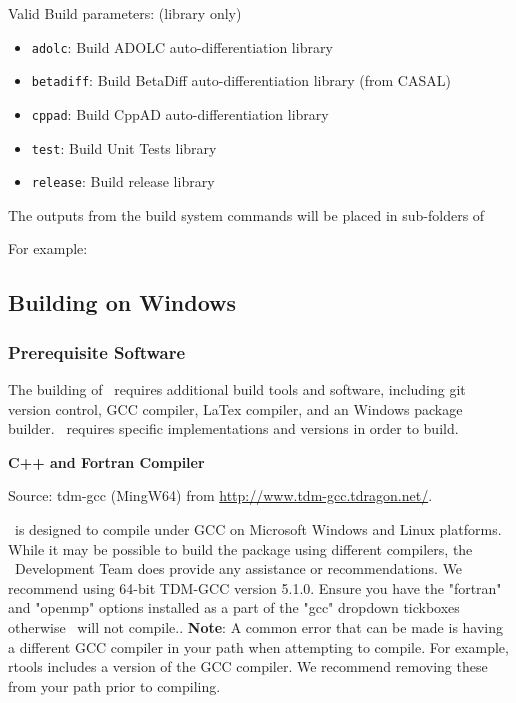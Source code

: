 Valid Build parameters: (library only)
\begin{itemize}
  \item \texttt{adolc}: Build ADOLC auto-differentiation library
  \item \texttt{betadiff}: Build BetaDiff auto-differentiation library (from CASAL)
  \item \texttt{cppad}: Build CppAD auto-differentiation library
  \item \texttt{test}: Build Unit Tests library
  \item \texttt{release}: Build release library
\end{itemize}

The outputs from the build system commands will be placed in sub-folders of 

For example:





\subsection{Building on Windows}

\subsubsection{Prerequisite Software}

The building of \CNAME\ requires additional build tools and software, including git version control, GCC compiler, LaTex compiler, and an Windows package builder. \CNAME\ requires specific implementations and versions in order to build. 

\textbf{C++ and Fortran Compiler}

Source: tdm-gcc (MingW64) from \url{http://www.tdm-gcc.tdragon.net/}.

\CNAME\ is designed to compile under GCC on Microsoft Windows and Linux  platforms. While it may be possible to build the package using different compilers, the \CNAME\ Development Team does provide any assistance or recommendations. We recommend using 64-bit TDM-GCC version 5.1.0. Ensure you have the "fortran" and "openmp" options installed as a part of the "gcc" dropdown tickboxes otherwise \CNAME\ will not compile.. \textbf{Note}: A common error that can be made is having a different GCC compiler in your path when attempting to compile. For example, rtools includes a version of the GCC compiler. We recommend removing these from your path prior to compiling.



